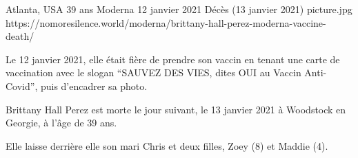{Atlanta, USA}
{39 ans}
{Moderna}
{12 janvier 2021}
{Décès (13 janvier 2021)}
{picture.jpg}
{https://nomoresilence.world/moderna/brittany-hall-perez-moderna-vaccine-death/}
{

Le 12 janvier 2021, elle était fière de prendre son vaccin en tenant une carte
de vaccination avec le slogan “SAUVEZ DES VIES, dites OUI au Vaccin Anti-Covid”,
puis d'encadrer sa photo.

Brittany Hall Perez est morte le jour suivant, le 13 janvier 2021 à Woodstock en
Georgie, à l'âge de 39 ans.

Elle laisse derrière elle son mari Chris et deux filles, Zoey (8) et Maddie (4).

}
